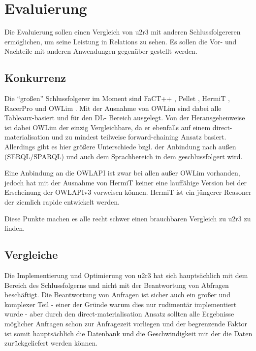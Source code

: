 \chapter{Evaluierung}
Die Evaluierung sollen einen Vergleich von u2r3 mit anderen Schlussfolgereren ermöglichen, um seine Leistung in Relations zu sehen. Es sollen die Vor- und Nachteile mit anderen Anwendungen gegenüber gestellt werden.

\section{Konkurrenz}
Die ``großen'' Schlussfolgerer im Moment sind FaCT++ \cite{Factpp}, Pellet \cite{Pellet}, HermiT \cite{Hermit}, RacerPro \cite{RacerPro} und OWLim \cite{OWLim}. Mit der Ausnahme von OWLim sind dabei alle Tableaux-basiert und für den DL- Bereich ausgelegt. Von der Heransgehenweise ist dabei OWLim der einzig Vergleichbare, da er ebenfalls auf einem direct-materialisation und zu mindest teilweise forward-chaining Ansatz basiert. Allerdings gibt es hier größere Unterschiede bzgl. der Anbindung nach außen (SERQL/SPARQL) und auch dem Sprachbereich in dem geschlussfolgert wird.

Eine Anbindung an die OWLAPI ist zwar bei allen außer OWLim vorhanden, jedoch hat mit der Ausnahme von HermiT keiner eine lauffähige Version bei der Erscheinung der OWLAPIv3 vorweisen können. HermiT ist ein jüngerer Reasoner der ziemlich rapide entwickelt werden.

Diese Punkte machen es alle recht schwer einen brauchbaren Vergleich zu u2r3 zu finden.

\section{Vergleiche}
\label{abschnitt-vergleiche}
Die Implementierung und Optimierung von u2r3 hat sich hauptsächlich mit dem Bereich des Schlussfolgerns und nicht mit der Beantwortung von Abfragen beschäftigt. Die Beantwortung von Anfragen ist sicher auch ein großer und komplexer Teil - einer der Gründe warum dies nur rudimentär implementiert wurde - aber durch den direct-materialisation Ansatz sollten alle Ergebnisse möglicher Anfragen schon zur Anfragezeit vorliegen und der begrenzende Faktor ist somit hauptsächlich die Datenbank und die Geschwindigkeit mit der die Daten zurückgeliefert werden können.


